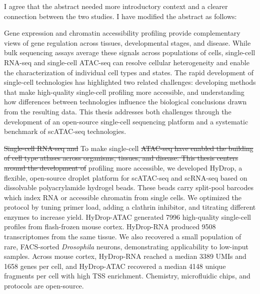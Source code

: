 \documentclass[11pt,a4paper]{article}
\newcommand{\deleted}[1]{{\color{removed}\sout{#1}}}
\newcommand{\inserted}[1]{{\color{added}#1}}
\begin{document}
I agree that the abstract needed more introductory context and a clearer connection between the two studies. I have modified the abstract as follows:

\begin{reviewcomment}
\setlength{\parskip}{0.5\baselineskip}
\inserted{Gene expression and chromatin accessibility profiling provide complementary views of gene regulation across tissues, developmental stages, and disease. While bulk sequencing assays average these signals across populations of cells, single-cell RNA-seq and single-cell ATAC-seq can resolve cellular heterogeneity and enable the characterization of individual cell types and states. The rapid development of single-cell technologies has highlighted two related challenges: developing methods that make high-quality single-cell profiling more accessible, and understanding how differences between technologies influence the biological conclusions drawn from the resulting data. This thesis addresses both challenges through the development of an open-source single-cell sequencing platform and a systematic benchmark of scATAC-seq technologies.}

\deleted{Single-cell RNA-seq and} \inserted{To make} single-cell \deleted{ATAC-seq have enabled the building of cell type atlases across organisms, tissues, and disease. This thesis centers around the development of} \inserted{profiling more accessible, we developed} HyDrop, a flexible, open-source droplet platform for scATAC-seq and scRNA-seq based on dissolvable polyacrylamide hydrogel beads. These beads carry split-pool barcodes which index RNA or accessible chromatin from single cells. We optimized the protocol by tuning primer load, adding a clathrin inhibitor, and titrating different enzymes to increase yield. HyDrop-ATAC generated \num{7996} high-quality single-cell profiles from flash-frozen mouse cortex. HyDrop-RNA produced \num{9508} transcriptomes from the same tissue. We also recovered a small population of rare, FACS-sorted \textit{Drosophila} neurons, demonstrating applicability to low-input samples. Across mouse cortex, HyDrop-RNA reached a median \num{3389} UMIs and \num{1658} genes per cell, and HyDrop-ATAC recovered a median \num{4148} unique fragments per cell with high TSS enrichment. Chemistry, microfluidic chips, and protocols are open-source.


\end{reviewcomment}
\end{document}
